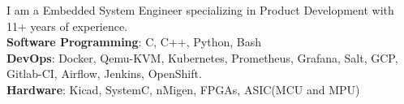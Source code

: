
\begin{cvparagraph}
    I am a Embedded System Engineer specializing in Product Development with 11+ years of experience.\\
\textbf{Software Programming}:  C, C++, Python, Bash\\
\textbf{DevOps}:  Docker, Qemu-KVM, Kubernetes, Prometheus, Grafana, Salt, GCP, Gitlab-CI, Airflow, Jenkins, OpenShift.\\
\textbf{Hardware}:  Kicad, SystemC, nMigen, FPGAs, ASIC(MCU and MPU)\\
\end{cvparagraph}



